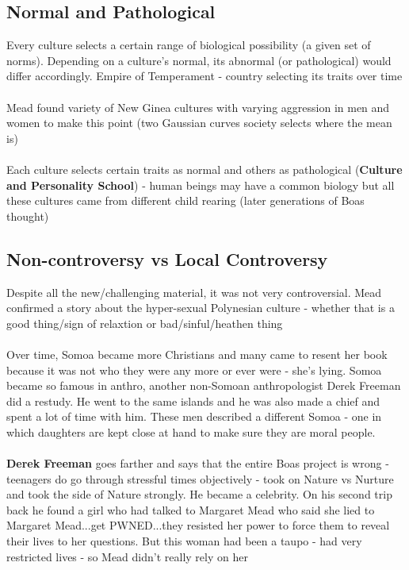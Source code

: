 \documentclass{article}
\begin{document}
\subsection{Normal and Pathological}
Every culture selects a certain range of biological possibility (a given set of norms). Depending on a culture's normal, its abnormal (or pathological) would differ accordingly. Empire of Temperament - country selecting its traits over time \\ \\ 
Mead found variety of New Ginea cultures with varying aggression in men and women to make this point (two Gaussian curves society selects where the mean is) \\ \\ 
Each culture selects certain traits as normal and others as pathological (\textbf{Culture and Personality School}) - human beings may have a common biology but all these cultures came from different child rearing (later generations of Boas thought)

\subsection{Non-controversy vs Local Controversy}
Despite all the new/challenging material, it was not very controversial. Mead confirmed a story about the hyper-sexual Polynesian culture - whether that is a good thing/sign of relaxtion or bad/sinful/heathen thing \\ \\ 
Over time, Somoa became more Christians and many came to resent her book because it was not who they were any more or ever were - she's lying. Somoa became so famous in anthro, another non-Somoan anthropologist Derek Freeman did a restudy. He went to the same islands and he was also made a chief and spent a lot of time with him. These men described a different Somoa - one in which daughters are kept close at hand to make sure they are moral people. \\ \\ 
\textbf{Derek Freeman} goes farther and says that the entire Boas project is wrong - teenagers do go through stressful times objectively - took on Nature vs Nurture and took the side of Nature strongly. He became a celebrity. On his second trip back he found a girl who had talked to Margaret Mead who said she lied to Margaret Mead...get PWNED...they resisted her power to force them to reveal their lives to her questions. But this woman had been a taupo - had very restricted lives - so Mead didn't really rely on her
\end{document}
